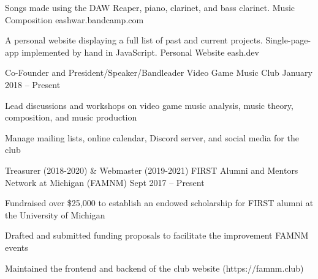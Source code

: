 \documentclass[]{awesome-cv}
\begin{document}

	
	\vspace{-6mm}
	\cventry
	{Songs made using the DAW Reaper, piano, clarinet, and bass clarinet.}
	{Music Composition}
	{eashwar.bandcamp.com}
	{}
	{}
	
	\vspace{-6mm}
	\cventry
	{A personal website displaying a full list of past and current projects. Single-page-app implemented by hand in JavaScript.}
	{Personal Website}
	{eash.dev}
	{}
	{}
	
	\vspace{-5mm}

\vspace{-2mm}
\vspace{-2mm}
	\cventry
	{Co-Founder and President/Speaker/Bandleader}
	{Video Game Music Club}
	{}
	{January 2018 – Present}
	{\begin{cvitems}
		\item {Lead discussions and workshops on video game music analysis, music theory, composition, and music production}
		\item {Manage mailing lists, online calendar, Discord server, and social media for the club}
		\end{cvitems}}

	\vspace{-4mm}
	\cventry
	{Treasurer (2018-2020) \& Webmaster (2019-2021)}
	{FIRST Alumni and Mentors Network at Michigan (FAMNM)}
	{}
	{Sept 2017 – Present}
	{\begin{cvitems}
		\item {Fundraised over \$25,000 to establish an endowed scholarship for FIRST alumni at the University of Michigan}
		\item {Drafted and submitted funding proposals to facilitate the improvement FAMNM events}
		\item {Maintained the frontend and backend of the club website (https://famnm.club)}
		\end{cvitems}}
	
\end{document}
